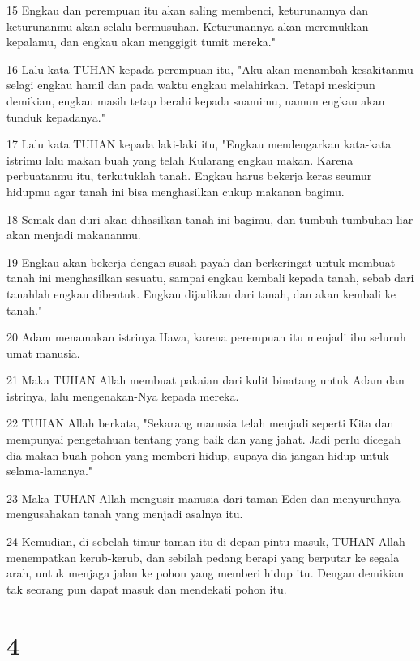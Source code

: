 \par 15 Engkau dan perempuan itu akan saling membenci, keturunannya dan keturunanmu akan selalu bermusuhan. Keturunannya akan meremukkan kepalamu, dan engkau akan menggigit tumit mereka."
\par 16 Lalu kata TUHAN kepada perempuan itu, "Aku akan menambah kesakitanmu selagi engkau hamil dan pada waktu engkau melahirkan. Tetapi meskipun demikian, engkau masih tetap berahi kepada suamimu, namun engkau akan tunduk kepadanya."
\par 17 Lalu kata TUHAN kepada laki-laki itu, "Engkau mendengarkan kata-kata istrimu lalu makan buah yang telah Kularang engkau makan. Karena perbuatanmu itu, terkutuklah tanah. Engkau harus bekerja keras seumur hidupmu agar tanah ini bisa menghasilkan cukup makanan bagimu.
\par 18 Semak dan duri akan dihasilkan tanah ini bagimu, dan tumbuh-tumbuhan liar akan menjadi makananmu.
\par 19 Engkau akan bekerja dengan susah payah dan berkeringat untuk membuat tanah ini menghasilkan sesuatu, sampai engkau kembali kepada tanah, sebab dari tanahlah engkau dibentuk. Engkau dijadikan dari tanah, dan akan kembali ke tanah."
\par 20 Adam menamakan istrinya Hawa, karena perempuan itu menjadi ibu seluruh umat manusia.
\par 21 Maka TUHAN Allah membuat pakaian dari kulit binatang untuk Adam dan istrinya, lalu mengenakan-Nya kepada mereka.
\par 22 TUHAN Allah berkata, "Sekarang manusia telah menjadi seperti Kita dan mempunyai pengetahuan tentang yang baik dan yang jahat. Jadi perlu dicegah dia makan buah pohon yang memberi hidup, supaya dia jangan hidup untuk selama-lamanya."
\par 23 Maka TUHAN Allah mengusir manusia dari taman Eden dan menyuruhnya mengusahakan tanah yang menjadi asalnya itu.
\par 24 Kemudian, di sebelah timur taman itu di depan pintu masuk, TUHAN Allah menempatkan kerub-kerub, dan sebilah pedang berapi yang berputar ke segala arah, untuk menjaga jalan ke pohon yang memberi hidup itu. Dengan demikian tak seorang pun dapat masuk dan mendekati pohon itu.

\chapter{4}

